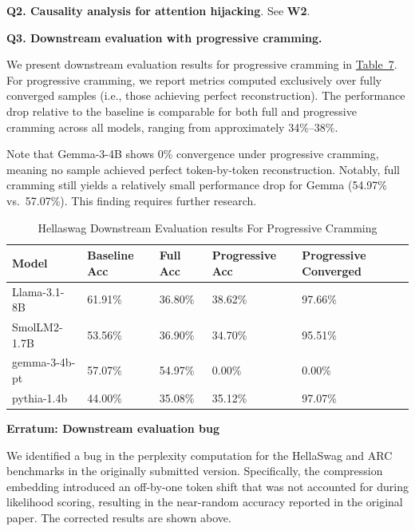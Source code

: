 \textbf{Q2. Causality analysis for attention hijacking}. See \textbf{W2}.

\textbf{Q3. Downstream evaluation with progressive cramming.}

We present downstream evaluation results for progressive cramming in \href{https://drive.google.com/file/d/1DIjiTpyIqQ4xuW0k9Q7mjCOFuXUPz2YX/view?usp=sharing}{Table~7}. For progressive cramming, we report metrics computed exclusively over fully converged samples (i.e., those achieving perfect reconstruction). The performance drop relative to the baseline is comparable for both full and progressive cramming across all models, ranging from approximately 34\%--38\%.

Note that Gemma-3-4B shows 0\% convergence under progressive cramming, meaning no sample achieved perfect token-by-token reconstruction. Notably, full cramming still yields a relatively small performance drop for Gemma (54.97\% vs.\ 57.07\%). This finding requires further research.

\begin{table}[]
    \centering
    \caption{Hellaswag Downstream Evaluation results For Progressive Cramming}
    \label{tab:rebuttle_downstream_eval_progressive}
\begin{tabular}{lllll}
    \hline
 Model         & Baseline Acc  & Full Acc  & Progressive Acc  & Progressive Converged    \\
    \hline
 Llama-3.1-8B  & 61.91\%       &  36.80\%    & 38.62\%        & 97.66\%               \\
 SmolLM2-1.7B  & 53.56\%       &  36.90\%    & 34.70\%        & 95.51\%               \\
 gemma-3-4b-pt & 57.07\%       &  54.97\%    & 0.00\%         & 0.00\%                \\
 pythia-1.4b   & 44.00\%       &  35.08\%    & 35.12\%        & 97.07\%               \\
    \hline
\end{tabular}
\end{table}


\textbf{Erratum: Downstream evaluation bug}

We identified a bug in the perplexity computation for the HellaSwag and ARC benchmarks in the originally submitted version. Specifically, the compression embedding introduced an off-by-one token shift that was not accounted for during likelihood scoring, resulting in the near-random accuracy reported in the original paper. The corrected results are shown above.


